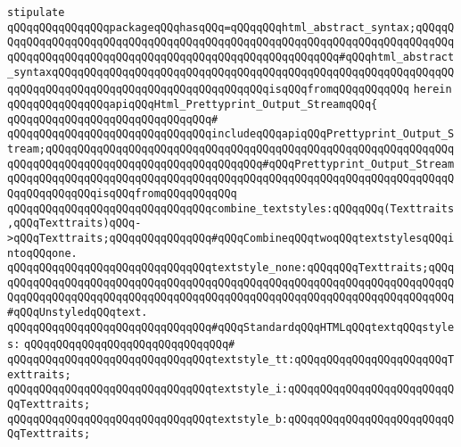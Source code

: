 \verb|stipulate|\newline
\verb|qQQqqQQqqQQqqQQqpackageqQQqhasqQQq=qQQqqQQqhtml_abstract_syntax;qQQqqQQqqQQqqQQqqQQqqQQqqQQqqQQqqQQqqQQqqQQqqQQqqQQqqQQqqQQqqQQqqQQqqQQqqQQqqQQqqQQqqQQqqQQqqQQqqQQqqQQqqQQqqQQqqQQqqQQqqQQqqQQq#qQQqhtml_abstract_syntaxqQQqqQQqqQQqqQQqqQQqqQQqqQQqqQQqqQQqqQQqqQQqqQQqqQQqqQQqqQQqqQQqqQQqqQQqqQQqqQQqqQQqqQQqqQQqqQQqqQQqqQQqisqQQqfromqQQqqQQqqQQq|\newline
\verb|herein|\newline
\newline
\verb|qQQqqQQqqQQqqQQqapiqQQqHtml_Prettyprint_Output_StreamqQQq{|\newline
\verb|qQQqqQQqqQQqqQQqqQQqqQQqqQQqqQQq#|\newline
\verb|qQQqqQQqqQQqqQQqqQQqqQQqqQQqqQQqincludeqQQqapiqQQqPrettyprint_Output_Stream;qQQqqQQqqQQqqQQqqQQqqQQqqQQqqQQqqQQqqQQqqQQqqQQqqQQqqQQqqQQqqQQqqQQqqQQqqQQqqQQqqQQqqQQqqQQqqQQqqQQqqQQq#qQQqPrettyprint_Output_StreamqQQqqQQqqQQqqQQqqQQqqQQqqQQqqQQqqQQqqQQqqQQqqQQqqQQqqQQqqQQqqQQqqQQqqQQqqQQqqQQqqQQqisqQQqfromqQQqqQQqqQQq|\newline
\newline
\verb|qQQqqQQqqQQqqQQqqQQqqQQqqQQqqQQqcombine_textstyles:qQQqqQQq(Texttraits,qQQqTexttraits)qQQq->qQQqTexttraits;qQQqqQQqqQQqqQQq#qQQqCombineqQQqtwoqQQqtextstylesqQQqintoqQQqone.|\newline
\newline
\verb|qQQqqQQqqQQqqQQqqQQqqQQqqQQqqQQqtextstyle_none:qQQqqQQqTexttraits;qQQqqQQqqQQqqQQqqQQqqQQqqQQqqQQqqQQqqQQqqQQqqQQqqQQqqQQqqQQqqQQqqQQqqQQqqQQqqQQqqQQqqQQqqQQqqQQqqQQqqQQqqQQqqQQqqQQqqQQqqQQqqQQqqQQqqQQqqQQqqQQq#qQQqUnstyledqQQqtext.|\newline
\newline
\verb|qQQqqQQqqQQqqQQqqQQqqQQqqQQqqQQq#qQQqStandardqQQqHTMLqQQqtextqQQqstyles:|\newline
\verb|qQQqqQQqqQQqqQQqqQQqqQQqqQQqqQQq#|\newline
\verb|qQQqqQQqqQQqqQQqqQQqqQQqqQQqqQQqtextstyle_tt:qQQqqQQqqQQqqQQqqQQqqQQqTexttraits;|\newline
\verb|qQQqqQQqqQQqqQQqqQQqqQQqqQQqqQQqtextstyle_i:qQQqqQQqqQQqqQQqqQQqqQQqqQQqTexttraits;|\newline
\verb|qQQqqQQqqQQqqQQqqQQqqQQqqQQqqQQqtextstyle_b:qQQqqQQqqQQqqQQqqQQqqQQqqQQqTexttraits;|\newline
